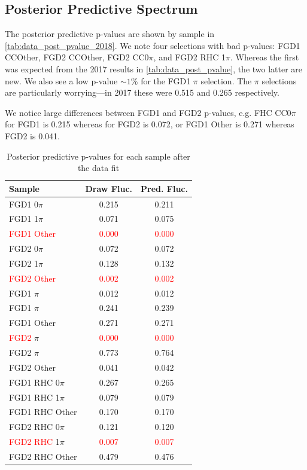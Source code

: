 \subsection{Posterior Predictive Spectrum}
The posterior predictive p-values are shown by sample in \autoref{tab:data_post_pvalue_2018}. We note four selections with bad p-values: FGD1 CCOther, FGD2 CCOther, FGD2 \numubar CC0$\pi$, and FGD2 \numu RHC 1$\pi$. Whereas the first was expected from the 2017 results in \autoref{tab:data_post_pvalue}, the two latter are new. We also see a low p-value $\sim1\%$ for the FGD1 $\pi$ selection. The $\pi$ selections are particularly worrying---in 2017 these were 0.515 and 0.265 respectively.

We notice large differences between FGD1 and FGD2 p-values, e.g. FHC CC0$\pi$ for FGD1 is 0.215 whereas for FGD2 is 0.072, or FGD1 \numubar Other is 0.271 whereas FGD2 is 0.041.
\begin{table}[h]
	\centering
	\begin{tabular}{l | c c }
		\hline \hline
		Sample & Draw Fluc. & Pred. Fluc. \\
		\hline
		FGD1 0$\pi$ & 0.215 & 0.211 \\
		FGD1 1$\pi$ & 0.071 & 0.075 \\
		\textcolor{red}{FGD1 Other}  & \textcolor{red}{0.000} & \textcolor{red}{0.000} \\
		\hline
		FGD2 0$\pi$ & 0.072 & 0.072 \\
		FGD2 1$\pi$ & 0.128 & 0.132 \\
		\textcolor{red}{FGD2 Other}  & \textcolor{red}{0.002} & \textcolor{red}{0.002} \\
		\hline
		FGD1 \numubar 0$\pi$ & 0.012 & 0.012 \\
		FGD1 \numubar 1$\pi$ & 0.241 & 0.239 \\
		FGD1 \numubar Other  & 0.271 & 0.271 \\
		\hline
		\textcolor{red}{FGD2} \numubar 0$\pi$ & \textcolor{red}{0.000} & \textcolor{red}{0.000} \\
		FGD2 \numubar 1$\pi$ & 0.773 & 0.764 \\
		FGD2 \numubar Other  & 0.041 & 0.042 \\
		\hline
		FGD1 \numu RHC 0$\pi$ & 0.267 & 0.265 \\
		FGD1 \numu RHC 1$\pi$ & 0.079 & 0.079 \\
		FGD1 \numu RHC Other  & 0.170 & 0.170 \\
		\hline
		FGD2 \numu RHC 0$\pi$ & 0.121 & 0.120 \\
		\textcolor{red}{FGD2} \numu \textcolor{red}{RHC} 1$\pi$ & \textcolor{red}{0.007} & \textcolor{red}{0.007} \\
		FGD2 \numu RHC Other  & 0.479 & 0.476 \\
		\hline
		\hline
	\end{tabular}
	\caption{Posterior predictive p-values for each sample after the data fit}
	\label{tab:data_post_pvalue_2018}
\end{table}

